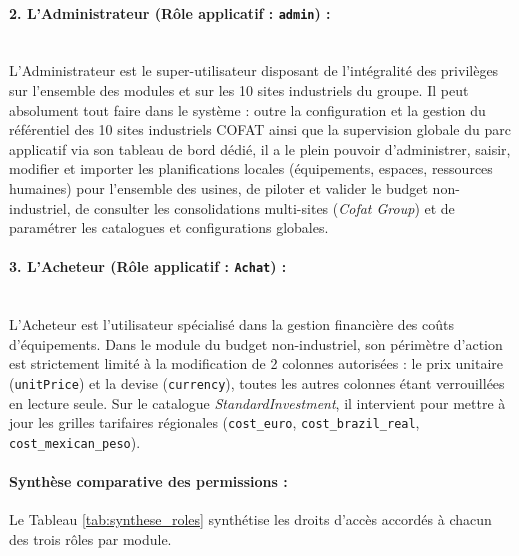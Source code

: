 \paragraph{2. L'Administrateur (Rôle applicatif : \texttt{admin}) :}\\
L'Administrateur est le super-utilisateur disposant de l'intégralité des privilèges sur l'ensemble des modules et sur les 10 sites industriels du groupe. Il peut absolument tout faire dans le système : outre la configuration et la gestion du référentiel des 10 sites industriels COFAT ainsi que la supervision globale du parc applicatif via son tableau de bord dédié, il a le plein pouvoir d'administrer, saisir, modifier et importer les planifications locales (équipements, espaces, ressources humaines) pour l'ensemble des usines, de piloter et valider le budget non-industriel, de consulter les consolidations multi-sites (\textit{Cofat Group}) et de paramétrer les catalogues et configurations globales.

\paragraph{3. L'Acheteur (Rôle applicatif : \texttt{Achat}) :}\\
L'Acheteur est l'utilisateur spécialisé dans la gestion financière des coûts d'équipements. Dans le module du budget non-industriel, son périmètre d'action est strictement limité à la modification de 2 colonnes autorisées : le prix unitaire (\texttt{unitPrice}) et la devise (\texttt{currency}), toutes les autres colonnes étant verrouillées en lecture seule. Sur le catalogue \textit{StandardInvestment}, il intervient pour mettre à jour les grilles tarifaires régionales (\texttt{cost\_euro}, \texttt{cost\_brazil\_real}, \texttt{cost\_mexican\_peso}).

\paragraph{Synthèse comparative des permissions :}
Le Tableau \ref{tab:synthese_roles} synthétise les droits d'accès accordés à chacun des trois rôles par module.

